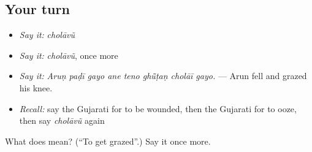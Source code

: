 \subsection*{Your turn}
\begin{itemize}
\raggedright
  \item \emph{Say it:} \emph{cholāvũ}
  \item \emph{Say it:} \emph{cholāvũ}, once more
  \item \emph{Say it:} \emph{Aruṇ paḍī gayo ane teno ghū̃ṭaṇ cholāī gayo.} — Arun fell and grazed his knee.
  \item \emph{Recall:} say the Gujarati for to be wounded, then the Gujarati for to ooze, then say \emph{cholāvũ} again
\end{itemize}

\begin{tcolorbox}[breakable,colback=teal!4,colframe=teal!35!black,title={Before you move on}]
What does  mean? (\textquotedblleft{}To get grazed\textquotedblright{}.) Say it once more.
\end{tcolorbox}
